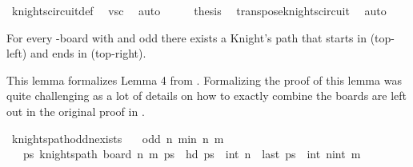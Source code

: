 \begin{isabellebody}
\ knights{\isacharunderscore}{\kern0pt}circuit{\isacharunderscore}{\kern0pt}def\ \isamarkupfalse%
\ vs{\isacharunderscore}{\kern0pt}c\ \isamarkupfalse%
\ auto\isanewline
\ \ \isamarkupfalse%
\ \isamarkupfalse%
\ {\isacharquery}{\kern0pt}thesis\ \isamarkupfalse%
\ transpose{\isacharunderscore}{\kern0pt}knights{\isacharunderscore}{\kern0pt}circuit\ \isamarkupfalse%
\ auto\isanewline
{}\isamarkupfalse%
%
\endisatagproof
{\isafoldproof}%
%
\isadelimproof
%
\endisadelimproof
%
\begin{isamarkuptext}%
For every -board with  and odd  there exists a Knight's path that 
starts in  (top-left) and ends in  (top-right).%
\end{isamarkuptext}\isamarkuptrue%
%
\begin{isamarkuptext}%
This lemma formalizes Lemma 4 from \cite{cull_decurtins_1987}. Formalizing the proof of 
this lemma was quite challenging as a lot of details on how to exactly combine the boards are 
left out in the original proof in \cite{cull_decurtins_1987}.%
\end{isamarkuptext}\isamarkuptrue%
\isamarkupfalse%
\ knights{\isacharunderscore}{\kern0pt}path{\isacharunderscore}{\kern0pt}odd{\isacharunderscore}{\kern0pt}n{\isacharunderscore}{\kern0pt}exists{\isacharcolon}{\kern0pt}\isanewline
\ \ \ {\isachardoublequoteopen}odd\ n{\isachardoublequoteclose}\ {\isachardoublequoteopen}min\ n\ m\ {\isasymge}\ {}{\isachardoublequoteclose}\isanewline
\ \ \ {\isachardoublequoteopen}{\isasymexists}ps{\isachardot}{\kern0pt}\ knights{\isacharunderscore}{\kern0pt}path\ {\isacharparenleft}{\kern0pt}board\ n\ m{\isacharparenright}{\kern0pt}\ ps\ {\isasymand}\ hd\ ps\ {\isacharequal}{\kern0pt}\ {\isacharparenleft}{\kern0pt}int\ n{\isacharcomma}{\kern0pt}{}{\isacharparenright}{\kern0pt}\ {\isasymand}\ last\ ps\ {\isacharequal}{\kern0pt}\ {\isacharparenleft}{\kern0pt}int\ n{\isacharminus}{\kern0pt}{}{\isacharcomma}{\kern0pt}int\ m{\isacharminus}{\kern0pt}{}{\isacharparenright}{\kern0pt}{\isachardoublequoteclose}\isanewline

\end{isabellebody}
